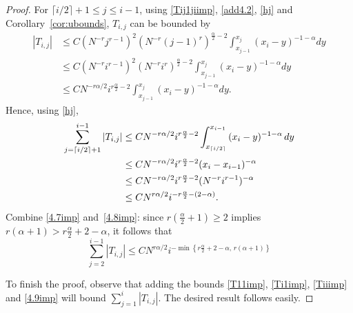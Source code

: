 \documentclass[smallextended]{svjour3}       %
\begin{document}
\begin{proof}
	For $\lceil i/2 \rceil+1 \le j \le i-1$, using \eqref{Tij1jiimp}, \eqref{add4.2}, \eqref{hj} and Corollary~\ref{cor:ubounds}, $T_{i,j}$ can be bounded by
	\begin{equation*}%
		\begin{split}
			\left| T_{i,j}\right|
			& \leq C (N^{-r}j^{r-1})^2 (N^{-r}(j-1)^r)^{\frac{\alpha}{2}-2}\int_{x_{j-1}}^{x_j}{(x_i-y)^{-1-\alpha}dy}\\
			& \leq C (N^{-r}i^{r-1})^2 (N^{-r}i^r)^{\frac{\alpha}{2}-2}\int_{x_{j-1}}^{x_j}{(x_i-y)^{-1-\alpha}dy}\\
			& \leq C N^{-r\alpha/2} i^{r\frac{\alpha}{2}-2} \int_{x_{j-1}}^{x_j}{(x_i-y)^{-1-\alpha}dy}.
		\end{split}
	\end{equation*}
	Hence, using \eqref{hj},
	\begin{align}
		\sum_{j=\lceil i/2\rceil+1}^{i-1} \left| T_{i,j}\right|
		& \leq C   N^{-r\alpha/2} i^{r\frac{\alpha}{2}-2} \int_{x_{\lceil i/2 \rceil}}^{x_{i-1}}{(x_i-y)^{-1-\alpha}\,dy}  \notag\\
		& \leq C N^{-r\alpha/2} i^{r\frac{\alpha}{2}-2} (x_i-x_{i-1})^{-\alpha}  \notag\\
		& \leq CN^{-r\alpha/2} i^{r\frac{\alpha}{2}-2} (N^{-r}i^{r-1})^{-\alpha}  \notag\\
		&\leq C N^{r\alpha/2} i^{-r\frac{\alpha}{2}-(2-\alpha)}.  \label{4.8imp}
	\end{align}
Combine \eqref{4.7imp} and~\eqref{4.8imp}: since $r\left(\frac{\alpha}{2}+1\right)\ge 2$ implies  
$r(\alpha+1)> r\frac{\alpha}{2}+2-\alpha$, it follows that
\begin{equation}\label{4.9imp}
\sum_{j=2}^{i-1}{\left| T_{i,j} \right|} \le C N^{r\alpha/2} 
	i^{-\min\left\{r\frac{\alpha}{2}+2-\alpha, \, r(\alpha+1)\right\}}
\end{equation}
	
To finish the proof, observe that adding the bounds \eqref{T11imp}, \eqref{Ti1imp}, \eqref{Tiiimp} and \eqref{4.9imp} 
will bound $\sum_{j=1}^{i}{|T_{i,j}|}$. The desired result follows easily.
\end{proof}
\end{document}

